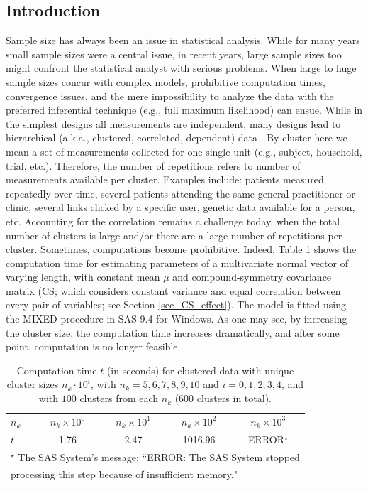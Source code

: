 \documentclass[11pt,a5paper,twoside]{book}
\begin{document}
\subsection{Introduction}
\label{sec_introduction}
Sample size has always been an issue in statistical analysis. While for many years small sample sizes were a central issue, in recent years, large sample sizes too might confront the statistical analyst with serious problems. When large to huge sample sizes  concur with complex models, prohibitive computation times, convergence issues, and the mere impossibility to analyze the data with the preferred inferential technique (e.g., full maximum likelihood) can ensue. While in the simplest designs all measurements are independent, many designs lead to hierarchical (a.k.a., clustered, correlated, dependent) data \cite{laird1982,zeger1986,verbeke2009}. By cluster here we mean a set of measurements collected for one single unit (e.g., subject, household, trial, etc.). Therefore, the number of repetitions refers to number of measurements available per cluster. Examples include: patients measured repeatedly over time, several patients attending the same general practitioner or clinic, several links clicked by a specific user, genetic data available for a person, etc. Accounting for the correlation remains a challenge today, when the total number of clusters is large and/or there are a large number of repetitions per cluster. Sometimes, computations become prohibitive. Indeed, Table \ref{tab_sas} shows the computation time for estimating parameters of a multivariate normal vector of varying length, with constant mean $\mu$ and compound-symmetry covariance matrix (CS; which considers constant variance and equal correlation between every pair of variables; see Section \ref{sec_CS_effect}). The model is fitted using the MIXED procedure in SAS 9.4 for Windows. As one may see, by increasing the cluster size, the computation time increases dramatically, and after some point, computation is no longer feasible.
\begin{table}[ht]
\caption{Computation time $t$ (in seconds) for clustered data with unique cluster sizes $n_k\cdot 10^i$, with $n_k=5,6,7,8,9,10$ and $i=0,1,2,3,4$, and with $100$ clusters from each $n_k$ (600 clusters in total).}
\label{tab_sas}
\centering
\begin{tabular}{lcccc}
  \hline \hline
$n_k$ & $n_k\times 10^0$ & $n_k\times 10^1$ & $n_k\times 10^2$ & $n_k\times 10^3$  \\ 

$t$ & 1.76 & 2.47 & 1016.96 & ERROR$^{\star}$ \\ 
   \hline \hline
   \multicolumn{5}{l}{$^{\star}$ The SAS System's message: ``ERROR: The SAS System stopped }\\
   \multicolumn{5}{l}{processing this step because of insufficient memory."}\\
\end{tabular}
\end{table}
\end{document}
